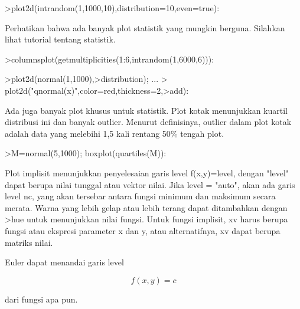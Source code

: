 \documentclass[a4paper,10pt]{article}
\begin{document}
\begin{eulernotebook}
\begin{eulercomment}
\begin{eulercomment}
\begin{eulercomment}
\begin{eulercomment}
\begin{eulerprompt}
>plot2d(intrandom(1,1000,10),distribution=10,even=true):
\end{eulerprompt}
\begin{eulercomment}
Perhatikan bahwa ada banyak plot statistik yang mungkin berguna.
Silahkan lihat tutorial tentang statistik.
\end{eulercomment}
\begin{eulerprompt}
>columnsplot(getmultiplicities(1:6,intrandom(1,6000,6))):
\end{eulerprompt}
\begin{eulerprompt}
>plot2d(normal(1,1000),>distribution); ...
>  plot2d("qnormal(x)",color=red,thickness=2,>add):
\end{eulerprompt}
\begin{eulercomment}
Ada juga banyak plot khusus untuk statistik. Plot kotak menunjukkan
kuartil distribusi ini dan banyak outlier. Menurut definisinya,
outlier dalam plot kotak adalah data yang melebihi 1,5 kali rentang
50\% tengah plot.
\end{eulercomment}
\begin{eulerprompt}
>M=normal(5,1000); boxplot(quartiles(M)):
\end{eulerprompt}
\begin{eulercomment}
Plot implisit menunjukkan penyelesaian garis level f(x,y)=level,
dengan "level" dapat berupa nilai tunggal atau vektor nilai. Jika
level = "auto", akan ada garis level nc, yang akan tersebar antara
fungsi minimum dan maksimum secara merata. Warna yang lebih gelap atau
lebih terang dapat ditambahkan dengan \textgreater{}hue untuk menunjukkan nilai
fungsi. Untuk fungsi implisit, xv harus berupa fungsi atau ekspresi
parameter x dan y, atau alternatifnya, xv dapat berupa matriks nilai.

Euler dapat menandai garis level

\end{eulercomment}
\begin{eulerformula}
\[
f(x,y) = c
\]
\end{eulerformula}
\begin{eulercomment}
dari fungsi apa pun.


\end{eulercomment}
\end{eulercomment}
\end{eulercomment}
\end{eulercomment}
\end{eulercomment}
\end{eulernotebook}
\end{document}
